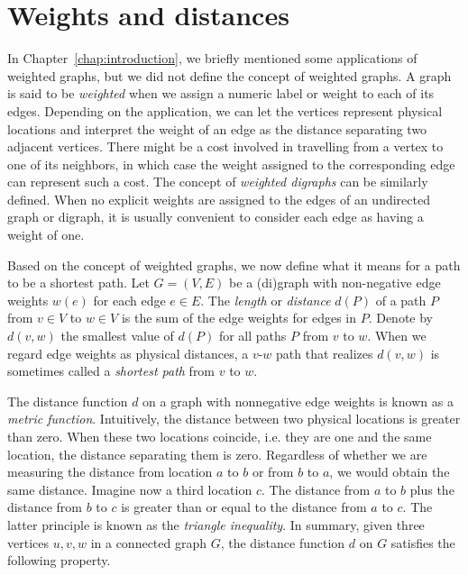 \section{Weights and distances}

In Chapter~\ref{chap:introduction}, we briefly mentioned some
applications of weighted graphs, but we did not define the concept of
weighted graphs. A graph is said to be
\emph{weighted} when we assign a numeric label
or weight to each of its edges. Depending on the application, we can
let the vertices represent physical locations and interpret the weight
of an edge as the distance separating two adjacent vertices. There
might be a cost involved in travelling from a vertex to one of its
neighbors, in which case the weight assigned to the corresponding edge
can represent such a cost. The concept of
\emph{weighted digraphs} can be similarly
defined. When no explicit weights are assigned to the edges of an
undirected graph or digraph, it is usually convenient to consider each
edge as having a weight of one.

Based on the concept of weighted graphs, we now define what it means
for a path to be a shortest path. Let $G = (V,E)$ be a (di)graph with
non-negative edge weights $w(e)$ for each edge $e \in E$. The
\emph{length} or
\emph{distance} $d(P)$ of a path $P$ from
$v \in V$ to $w \in V$ is the sum of the edge weights for edges in
$P$. Denote by $d(v,w)$ the smallest value of $d(P)$ for all paths $P$
from $v$ to $w$. When we regard edge weights as physical distances, a
$v$-$w$ path that realizes $d(v,w)$ is sometimes called a
\emph{shortest path} from $v$ to $w$.

The distance function $d$ on a graph with nonnegative edge weights is
known as a \emph{metric function}. Intuitively, the distance between
two physical locations is greater than zero. When these two locations
coincide, i.e. they are one and the same location, the distance
separating them is zero. Regardless of whether we are measuring the
distance from location $a$ to $b$ or from $b$ to $a$, we would obtain
the same distance. Imagine now a third location $c$. The distance from
$a$ to $b$ plus the distance from $b$ to $c$ is greater than or equal
to the distance from $a$ to $c$. The latter principle is known as the
\emph{triangle inequality}. In summary, given three vertices $u,v,w$
in a connected graph $G$, the distance function $d$ on $G$ satisfies
the following property.

